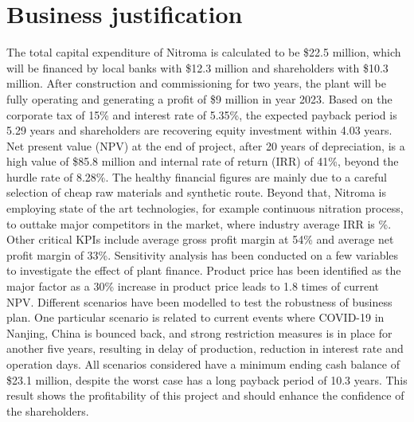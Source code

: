\section*{Business justification}


The total capital expenditure of Nitroma is calculated to be \$22.5 million, which will be financed by local banks with \$12.3 million and shareholders with \$10.3 million. After construction and commissioning for two years, the plant will be fully operating and generating a profit of \$9 million in year 2023. Based on the corporate tax of 15\% and interest rate of 5.35\%, the expected payback period is 5.29 years and shareholders are recovering equity investment within 4.03 years. Net present value (NPV) at the end of project, after 20 years of depreciation, is a high value of \$85.8 million and internal rate of return (IRR) of 41\%, beyond the hurdle rate of 8.28\%. The healthy financial figures are mainly due to a careful selection of cheap raw materials and synthetic route. Beyond that, Nitroma is employing state of the art technologies, for example continuous nitration process, to outtake major competitors in the market, where industry average IRR is \%. Other critical KPIs include average gross profit margin at 54\% and average net profit margin of 33\%.
\newline
Sensitivity analysis has been conducted on a few variables to investigate the effect of plant finance. Product price has been identified as the major factor as a 30\% increase in product price leads to 1.8 times of current NPV. Different scenarios have been modelled to test the robustness of business plan. One particular scenario is related to current events where COVID-19 in Nanjing, China is bounced back, and strong restriction measures is in place for another five years, resulting in delay of production, reduction in interest rate and operation days. All scenarios considered have a minimum ending cash balance of \$23.1 million, despite the worst case has a long payback period of 10.3 years. This result shows the profitability of this project and should enhance the confidence of the shareholders.
